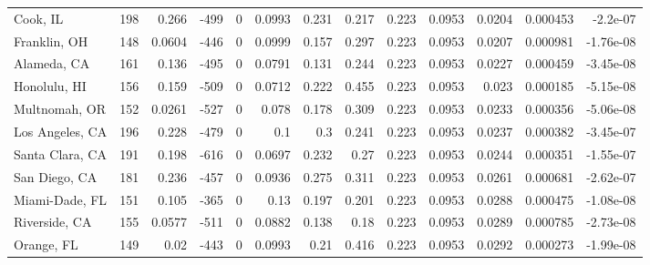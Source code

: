\documentclass[12pt,letterpaper]{article}
\begin{document}
\begin{appendices}
\begin{sidewaystable}
{\begin{tabular}{lrrrrrrrrrrrr}
 Cook, IL           & 198   & 0.266   & -499   &     0 &          0.0993 &           0.231  &         0.217  &              0.223 &             0.0953 &           0.0204  &        0.000453 &       -2.2e-07   \\
 Franklin, OH       & 148   & 0.0604  & -446   &     0 &          0.0999 &           0.157  &         0.297  &              0.223 &             0.0953 &           0.0207  &        0.000981 &       -1.76e-08  \\
 Alameda, CA        & 161   & 0.136   & -495   &     0 &          0.0791 &           0.131  &         0.244  &              0.223 &             0.0953 &           0.0227  &        0.000459 &       -3.45e-08  \\
 Honolulu, HI       & 156   & 0.159   & -509   &     0 &          0.0712 &           0.222  &         0.455  &              0.223 &             0.0953 &           0.023   &        0.000185 &       -5.15e-08  \\
 Multnomah, OR      & 152   & 0.0261  & -527   &     0 &          0.078  &           0.178  &         0.309  &              0.223 &             0.0953 &           0.0233  &        0.000356 &       -5.06e-08  \\
 Los Angeles, CA    & 196   & 0.228   & -479   &     0 &          0.1    &           0.3    &         0.241  &              0.223 &             0.0953 &           0.0237  &        0.000382 &       -3.45e-07  \\
 Santa Clara, CA    & 191   & 0.198   & -616   &     0 &          0.0697 &           0.232  &         0.27   &              0.223 &             0.0953 &           0.0244  &        0.000351 &       -1.55e-07  \\
 San Diego, CA      & 181   & 0.236   & -457   &     0 &          0.0936 &           0.275  &         0.311  &              0.223 &             0.0953 &           0.0261  &        0.000681 &       -2.62e-07  \\
 Miami-Dade, FL     & 151   & 0.105   & -365   &     0 &          0.13   &           0.197  &         0.201  &              0.223 &             0.0953 &           0.0288  &        0.000475 &       -1.08e-08  \\
 Riverside, CA      & 155   & 0.0577  & -511   &     0 &          0.0882 &           0.138  &         0.18   &              0.223 &             0.0953 &           0.0289  &        0.000785 &       -2.73e-08  \\
 Orange, FL         & 149   & 0.02    & -443   &     0 &          0.0993 &           0.21   &         0.416  &              0.223 &             0.0953 &           0.0292  &        0.000273 &       -1.99e-08  \\

\end{tabular}}
\end{sidewaystable}
\end{appendices}
\end{document}
